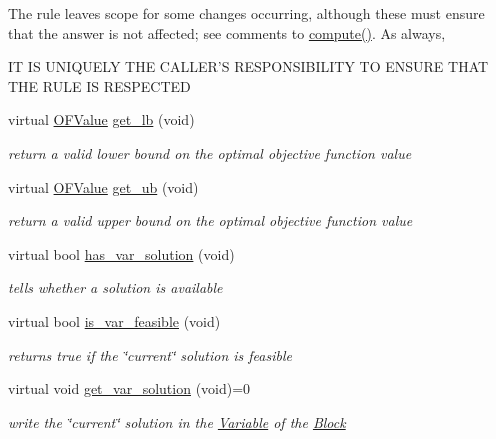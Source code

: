 \begin{Indent}
{The rule leaves scope for some changes occurring, although these must ensure that the answer is not affected; see comments to \mbox{\hyperlink{class_s_m_spp__di__unipi__it_1_1_solver_a504d4e3e174c7a518cc66156a8a45ce5}{compute()}}. As always, \begin{DoxyVerb}          IT IS UNIQUELY THE CALLER'S RESPONSIBILITY
            TO ENSURE THAT THE RULE IS RESPECTED\end{DoxyVerb}
 }\begin{DoxyCompactItemize}
\item 
virtual \mbox{\hyperlink{class_s_m_spp__di__unipi__it_1_1_solver_ab8ce6bff9c21fdcd41e355167209301a}{O\+F\+Value}} \mbox{\hyperlink{class_s_m_spp__di__unipi__it_1_1_solver_a4a4dbe4c2416d531c4619ca94fc07d31}{get\+\_\+lb}} (void)
\begin{DoxyCompactList}\small\item\em return a valid lower bound on the optimal objective function value \end{DoxyCompactList}\item 
virtual \mbox{\hyperlink{class_s_m_spp__di__unipi__it_1_1_solver_ab8ce6bff9c21fdcd41e355167209301a}{O\+F\+Value}} \mbox{\hyperlink{class_s_m_spp__di__unipi__it_1_1_solver_a7304d819b2eeff3d4ba650055b24e3a5}{get\+\_\+ub}} (void)
\begin{DoxyCompactList}\small\item\em return a valid upper bound on the optimal objective function value \end{DoxyCompactList}\item 
virtual bool \mbox{\hyperlink{class_s_m_spp__di__unipi__it_1_1_solver_aa96263f4e0c59225f3f5d54f03fe31ee}{has\+\_\+var\+\_\+solution}} (void)
\begin{DoxyCompactList}\small\item\em tells whether a solution is available \end{DoxyCompactList}\item 
virtual bool \mbox{\hyperlink{class_s_m_spp__di__unipi__it_1_1_solver_a038fa1e554e91724e1ce3f593aba55fd}{is\+\_\+var\+\_\+feasible}} (void)
\begin{DoxyCompactList}\small\item\em returns true if the \char`\"{}current\char`\"{} solution is feasible \end{DoxyCompactList}\item 
virtual void \mbox{\hyperlink{class_s_m_spp__di__unipi__it_1_1_solver_a91d7cd0dc4fa453406ef30db2bfa37a5}{get\+\_\+var\+\_\+solution}} (void)=0
\begin{DoxyCompactList}\small\item\em write the \char`\"{}current\char`\"{} solution in the \mbox{\hyperlink{class_s_m_spp__di__unipi__it_1_1_variable}{Variable}} of the \mbox{\hyperlink{class_s_m_spp__di__unipi__it_1_1_block}{Block}} \end{DoxyCompactList}\item 

\end{DoxyCompactItemize}
\end{Indent}
